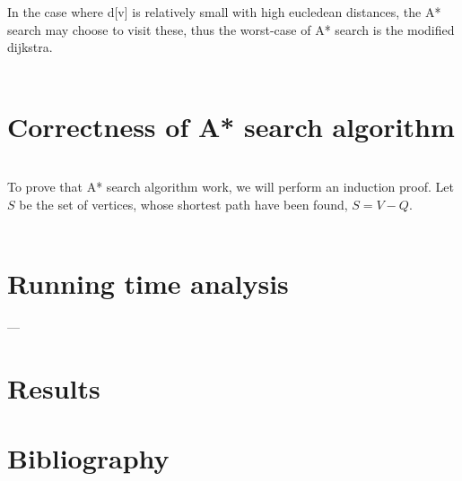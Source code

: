 \documentclass[11pt]{article}
\begin{document}
In the case where d[v] is relatively small with high eucledean distances, the A* search may choose to visit these, thus the worst-case of A* search is the modified dijkstra.\\\\



\newpage
\section{Correctness of A* search algorithm}\\
To prove that A* search algorithm work, we will perform an induction proof. Let $S$ be the set of vertices, whose shortest path have been found, $S=V-Q$.\\\\







\section{Running time analysis}
---

\section{Results}
\section{Bibliography}
\end{document}
